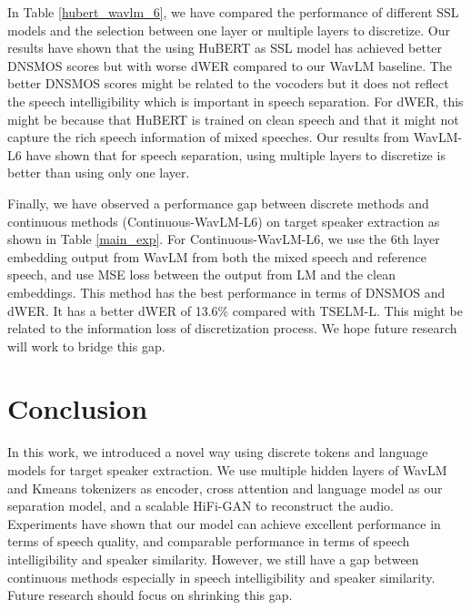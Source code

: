 \documentclass[conference]{IEEEtran}
\begin{document}
In Table \ref{hubert_wavlm_6}, we have compared the performance of different SSL models and the selection between one layer or multiple layers to discretize. 
Our results have shown that the using HuBERT as SSL model has achieved better DNSMOS scores but with worse dWER compared to our WavLM baseline.
The better DNSMOS scores might be related to the vocoders but it does not reflect the speech intelligibility which is important in speech separation. 
For dWER, this might be because that HuBERT is trained on clean speech and that it might not capture the rich speech information of mixed speeches. 
Our results from WavLM-L6 have shown that for speech separation, using multiple layers to discretize is better than using only one layer. 

Finally, we have observed a performance gap between discrete methods and continuous methods (Continuous-WavLM-L6) on target 
speaker extraction as shown in Table \ref{main_exp}. For Continuous-WavLM-L6,
we use the 6th layer embedding output from WavLM from both the mixed speech and reference speech, and use MSE loss between the output from LM and the clean embeddings. This method 
has the best performance in terms of DNSMOS and dWER. It has a better dWER of 13.6\% compared with TSELM-L. This might be related to the 
information loss of discretization process. We hope future research will work to bridge this gap.   

\section{Conclusion}
In this work, we introduced a novel way using discrete tokens and language models for target speaker extraction.
We use multiple hidden layers of WavLM and Kmeans tokenizers as encoder, cross attention and language model as our separation model, and a scalable HiFi-GAN to reconstruct the 
audio. 
Experiments have 
shown that our model can achieve excellent performance in terms of speech quality, and comparable performance in terms of speech intelligibility and 
speaker similarity. However, we still have a gap between continuous methods especially in speech intelligibility and speaker similarity. Future research should focus on shrinking 
this gap. 












\end{document}
